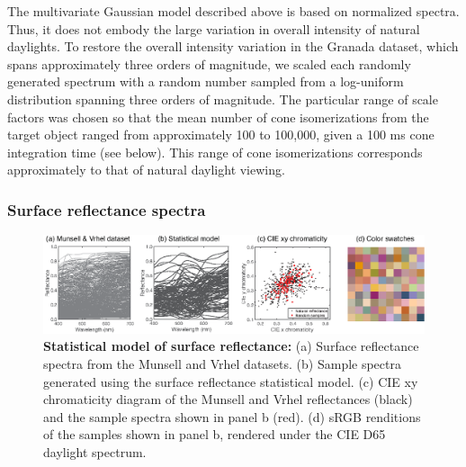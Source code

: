 \documentclass{jov}
\begin{document}
The multivariate Gaussian model described above is based on normalized spectra. 
Thus, it does not embody the large variation in overall intensity of natural daylights.
To restore the overall intensity variation in the Granada dataset, which spans approximately three orders of magnitude, we scaled each randomly generated spectrum with a random number sampled from a log-uniform distribution spanning three orders of magnitude.
The particular range of scale factors was chosen so that the mean number of cone isomerizations from the target object ranged from approximately 100 to 100,000, given a 100 ms cone integration time (see below).
This range of cone isomerizations corresponds approximately to that of natural daylight viewing.

\subsubsection{Surface reflectance spectra}
\begin{figure}
\centering
    \includegraphics[width=\textwidth]{Figure7.eps}
    \caption{{\bf Statistical model of surface reflectance:} (a) Surface reflectance spectra from the Munsell and Vrhel datasets. (b) Sample spectra generated using the surface reflectance statistical model. (c) CIE xy chromaticity diagram of the Munsell and Vrhel reflectances (black) and the sample spectra shown in panel b (red). (d) sRGB renditions of the samples shown in panel b, rendered under the CIE D65 daylight spectrum.}
\label{fig:surfaceReflectanceGeneration}
\end{figure}
\end{document}
